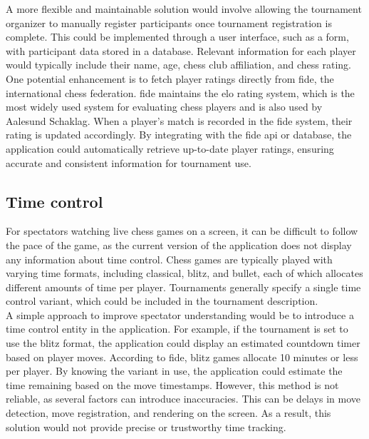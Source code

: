 A more flexible and maintainable solution would involve allowing the tournament organizer to manually register participants once tournament registration is complete. This could be implemented through a user interface, such as a form, with participant data stored in a database. Relevant information for each player would typically include their name, age, chess club affiliation, and chess rating. \\

One potential enhancement is to fetch player ratings directly from \gls{fide}, the international chess federation. \gls{fide} maintains the \gls{elo} rating system, which is the most widely used system for evaluating chess players and is also used by Aalesund Schaklag. When a player’s match is recorded in the \gls{fide} system, their rating is updated accordingly. By integrating with the \gls{fide} \gls{api} or database, the application could automatically retrieve up-to-date player ratings, ensuring accurate and consistent information for tournament use.

\subsection{Time control}
For spectators watching live chess games on a screen, it can be difficult to follow the pace of the game, as the current version of the application does not display any information about time control. Chess games are typically played with varying time formats, including \gls{classical}, \gls{blitz}, and \gls{bullet}, each of which allocates different amounts of time per player. Tournaments generally specify a single time control variant, which could be included in the tournament description. \\

A simple approach to improve spectator understanding would be to introduce a time control entity in the application. For example, if the tournament is set to use the \gls{blitz} format, the application could display an estimated countdown timer based on player moves. According to \gls{fide}, blitz games allocate 10 minutes or less per player. By knowing the variant in use, the application could estimate the time remaining based on the move timestamps. However, this method is not reliable, as several factors can introduce inaccuracies. This can be delays in move detection, move registration, and rendering on the screen. As a result, this solution would not provide precise or trustworthy time tracking. \\


